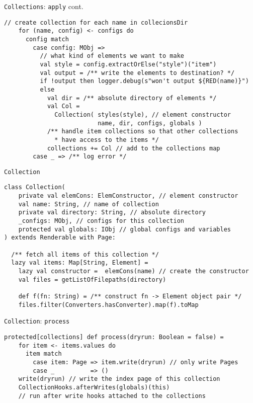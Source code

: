 \documentclass[compress, aspectratio=169]{beamer}
\begin{document}
\begin{frame}[fragile]{\texttt{Collections}: \texttt{apply} cont.}
    \vspace{.5em}
    \begin{lstlisting}[style=myscala]
    // create collection for each name in collecionsDir
    for (name, config) <- configs do
      config match
        case config: MObj =>
          // what kind of elements we want to make
          val style = config.extractOrElse("style")("item")
          val output = /** write the elements to destination? */
          if !output then logger.debug(s"won't output ${RED(name)}")
          else
            val dir = /** absolute directory of elements */
            val Col = 
              Collection( styles(style), // element constructor
                          name, dir, configs, globals )
            /** handle item collections so that other collections 
              * have access to the items */
            collections += Col // add to the collections map
        case _ => /** log error */
    \end{lstlisting}
\end{frame}

\begin{frame}[fragile]{\texttt{Collection}}
    \vspace{.5em}
    \begin{lstlisting}[style=myscala]
class Collection(
    private val elemCons: ElemConstructor, // element constructor
    val name: String, // name of collection
    private val directory: String, // absolute directory 
    _configs: MObj, // configs for this collection
    protected val globals: IObj // global configs and variables
) extends Renderable with Page:

  /** fetch all items of this collection */
  lazy val items: Map[String, Element] =
    lazy val constructor =  elemCons(name) // create the constructor
    val files = getListOfFilepaths(directory)

    def f(fn: String) = /** construct fn -> Element object pair */
    files.filter(Converters.hasConverter).map(f).toMap
    \end{lstlisting}
\end{frame}

\begin{frame}[fragile]{\texttt{Collection}: \texttt{process}}
    \begin{lstlisting}[style=myscala]
  protected[collections] def process(dryrun: Boolean = false) =
    for item <- items.values do
      item match
        case item: Page => item.write(dryrun) // only write Pages
        case _          => ()
    write(dryrun) // write the index page of this collection
    CollectionHooks.afterWrites(globals)(this)  
    // run after write hooks attached to the collections
    \end{lstlisting}
\end{frame}
\end{document}
